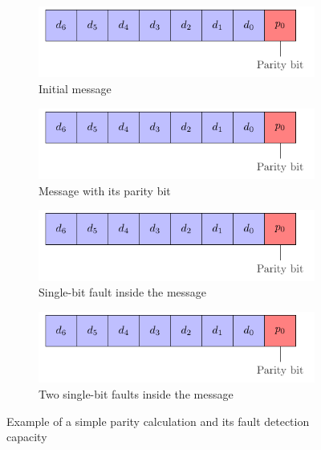 \begin{figure}[ht]
    \centering
    \begin{subfigure}[b]{0.49\textwidth}
        \includegraphics[width=\textwidth, page=2]{c5_countermeasures_dift/img/simple_parity.pdf}
        \caption{Initial message}
        \label{fig:simpleparity_example_1}
    \end{subfigure}
    \hfill
    \begin{subfigure}[b]{0.49\textwidth}
        \includegraphics[width=\textwidth, page=3]{c5_countermeasures_dift/img/simple_parity.pdf}
        \caption{Message with its parity bit}
        \label{fig:simpleparity_example_2}
    \end{subfigure}
    \hfill
    \begin{subfigure}[b]{0.49\textwidth}
        \includegraphics[width=\textwidth, page=4]{c5_countermeasures_dift/img/simple_parity.pdf}
        \caption{Single-bit fault inside the message}
        \label{fig:simpleparity_faulted_example_3}
    \end{subfigure}
    \hfill
    \begin{subfigure}[b]{0.49\textwidth}
        \includegraphics[width=\textwidth, page=5]{c5_countermeasures_dift/img/simple_parity.pdf}
        \caption{Two single-bit faults inside the message}
        \label{fig:simpleparity_faulted_example_4}
    \end{subfigure}
    \caption{Example of a simple parity calculation and its fault detection capacity}
    \label{fig:simpleparity_example}
\end{figure}

